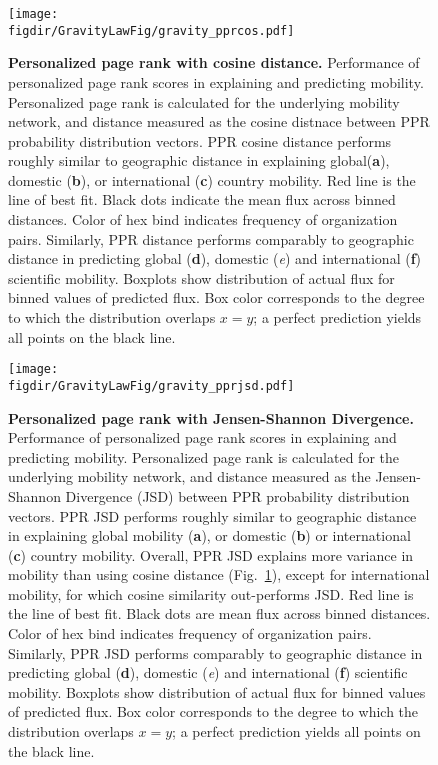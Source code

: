 \documentclass[12pt]{article} %
\def\figdir{../Figs}
\begin{document}
%
%
\begin{figure}[p!]
	\centering
	\texttt{[image: \\figdir/GravityLawFig/gravity\_pprcos.pdf]}
	\caption{
		\textbf{Personalized page rank with cosine distance.}
		Performance of personalized page rank scores in explaining and predicting mobility.
		Personalized page rank is calculated for the underlying mobility network, and distance measured as the cosine distnace between PPR probability distribution vectors.
		PPR cosine distance performs roughly similar to geographic distance in explaining global(\textbf{a}), domestic (\textbf{b}), or international (\textbf{c}) country mobility.
		Red line is the line of best fit.
		Black dots indicate the mean flux across binned distances.
		Color of hex bind indicates frequency of organization pairs.
		Similarly, PPR distance performs comparably to geographic distance in predicting global (\textbf{d}), domestic (\textit{e}) and international (\textbf{f}) scientific mobility.
		Boxplots show distribution of actual flux for binned values of predicted flux.
		Box color corresponds to the degree to which the distribution overlaps $x = y$;
		a perfect prediction yields all points on the black line.
	}
	\label{fig:supp:gravity_pprcos}
\end{figure}


%
%

\begin{figure}[p!]
	\centering
	\texttt{[image: \\figdir/GravityLawFig/gravity\_pprjsd.pdf]}
	\caption{
		\textbf{Personalized page rank with Jensen-Shannon Divergence.}
		Performance of personalized page rank scores in explaining and predicting mobility.
		Personalized page rank is calculated for the underlying mobility network, and distance measured as the Jensen-Shannon Divergence (JSD) between PPR probability distribution vectors.
		PPR JSD performs roughly similar to geographic distance in explaining global mobility (\textbf{a}), or domestic (\textbf{b}) or international (\textbf{c}) country mobility.
		Overall, PPR JSD explains more variance in mobility than using cosine distance (Fig.~\ref{fig:supp:gravity_pprcos}), except for international mobility, for which cosine similarity out-performs JSD.
		Red line is the line of best fit.
		Black dots are mean flux across binned distances.
		Color of hex bind indicates frequency of organization pairs.
		Similarly, PPR JSD performs comparably to geographic distance in predicting global (\textbf{d}), domestic (\textit{e}) and international (\textbf{f}) scientific mobility.
		Boxplots show distribution of actual flux for binned values of predicted flux.
		Box color corresponds to the degree to which the distribution overlaps $x = y$;
		a perfect prediction yields all points on the black line. 
	}
	\label{fig:supp:gravity_pprjsd}
\end{figure}
\end{document}
